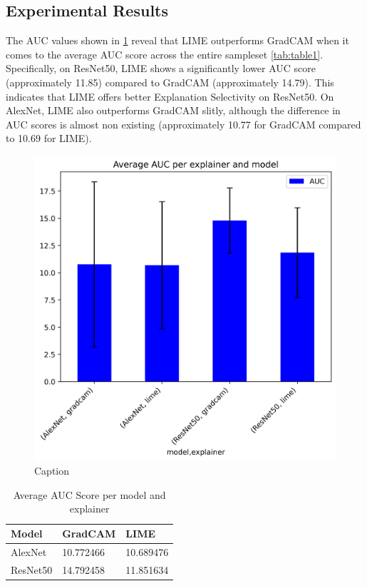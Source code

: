 \documentclass{article}
\begin{document}

\subsection{Experimental Results}
The AUC values shown in \ref{fig:average-auc-per-exp-and-model-plus-std-dev} reveal that LIME outperforms GradCAM when it comes to the average AUC score across the entire sampleset \ref{tab:table1}. Specifically, on ResNet50, LIME shows a significantly lower AUC score (approximately 11.85) compared to GradCAM (approximately 14.79). This indicates that LIME offers better Explanation Selectivity on ResNet50. On AlexNet, LIME also outperforms GradCAM slitly, although the difference in AUC scores is almost non existing (approximately 10.77 for GradCAM compared to 10.69 for LIME).

\begin{figure}
    \centering
    \includegraphics[width=.8\linewidth]{results/average-auc-per-exp-and-model-plus-std-dev.png}
    \caption{Caption}
    \label{fig:average-auc-per-exp-and-model-plus-std-dev}
\end{figure}



\begin{table}
    \centering
    \begin{tabular}{lll}
        \hline
        Model       & GradCAM      & LIME \\
        \hline
        AlexNet     & 10.772466    & 10.689476 \\
        ResNet50    & 14.792458    & 11.851634 \\
        \hline
    \end{tabular}
    \caption{Average AUC Score per model and explainer}
    \label{tab:plain}
\end{table}
\end{document}
